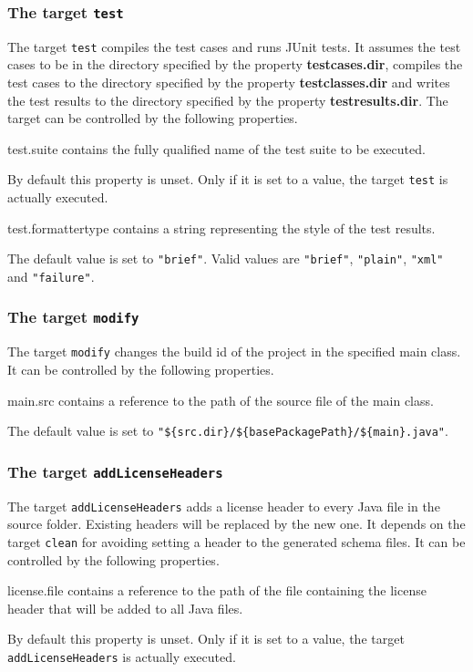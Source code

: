 \documentclass[a4paper,twoside,11pt,bibtotoc]{article}
\begin{document}
\subsubsection*{The target \texttt{test}}
The target \texttt{test} compiles the test cases and runs JUnit tests.
It assumes the test cases to be in the directory specified by the property \textbf{testcases.dir}, compiles the test cases to the directory specified by the property \textbf{testclasses.dir} and writes the test results to the directory specified by the property \textbf{testresults.dir}.
The target can be controlled by the following properties.
\begin{description*}
	\item[test.suite] contains the fully qualified name of the test suite to be executed.\par By default this property is unset. Only if it is set to a value, the target \texttt{test} is actually executed.
	\item[test.formattertype] contains a string representing the style of the test results.\par The default value is set to \texttt{"brief"}. Valid values are \texttt{"brief"}, \texttt{"plain"}, \texttt{"xml"} and \texttt{"failure"}.
\end{description*}

\subsubsection*{The target \texttt{modify}}
The target \texttt{modify} changes the build id of the project in the specified main class.
It can be controlled by the following properties.

\begin{description*}
	\item[main.src] contains a reference to the path of the source file of the main class.\par The default value is set to \texttt{"\$\{src.dir\}/\$\{basePackagePath\}/\$\{main\}.java"}.
\end{description*}

\subsubsection*{The target \texttt{addLicenseHeaders}}
The target \texttt{addLicenseHeaders} adds a license header to every Java file in the source folder.
Existing headers will be replaced by the new one.
It depends on the target \texttt{clean} for avoiding setting a header to the generated schema files.
It can be controlled by the following properties.
\begin{description*}
	\item[license.file] contains a reference to the path of the file containing the license header that will be added to all Java files.\par By default this property is unset. Only if it is set to a value, the target \texttt{addLicenseHeaders} is actually executed.
\end{description*}
\end{document}
